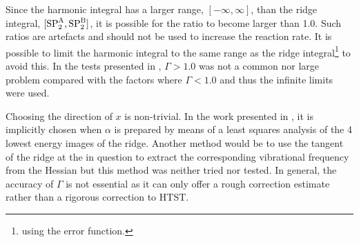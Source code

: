 Since the harmonic integral has a larger range, $[-\infty, \infty]$, than the ridge integral, $[\text{SP}_{2}^\text{A}, \text{SP}_{2}^\text{B}]$, it is possible for the ratio to become larger than 1.0.
Such ratios are artefacts and should not be used to increase the reaction rate.
It is possible to limit the harmonic integral to the same range as the ridge integral\footnote{using the error function.} to avoid this.
In the tests presented in , $\Gamma > 1.0$ was not a common nor large problem compared with the factors where $\Gamma < 1.0$ and thus the infinite limits were used.

Choosing the direction of $x$ is non-trivial.
In the work presented in , it is implicitly chosen when $\alpha$ is prepared by means of a least squares analysis of the 4 lowest energy images of the ridge.
Another method would be to use the tangent of the ridge at the  in question to extract the corresponding vibrational frequency from the Hessian but this method was neither tried nor tested.
In general, the accuracy of $\Gamma$ is not essential as it can only offer a rough correction estimate rather than a rigorous correction to HTST.
